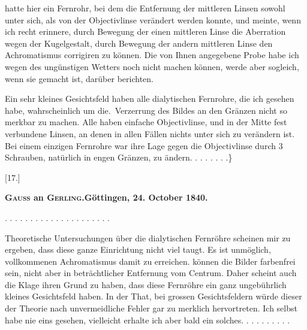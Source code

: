\par\clearpage{}
\noindent hatte hier ein Fernrohr, bei dem die Entfernung der mittleren Linsen sowohl unter sich, als von der Objectivlinse verändert werden konnte, und meinte, wenn ich recht erinnere, durch Bewegung der einen mittleren Linse die Aberration wegen der Kugelgestalt, durch Bewegung der andern mittleren Linse den Achromatismus corrigiren zu können. Die von Ihnen angegebene Probe habe ich wegen des ungünstigen Wetters noch nicht machen können, werde aber sogleich, wenn sie gemacht ist, darüber berichten.

Ein sehr kleines Gesichtsfeld haben alle dialytischen Fernrohre, die ich gesehen habe, wahrscheinlich um die.\ Verzerrung des Bildes an den Gränzen nicht so merkbar zu machen. Alle haben  einfache Objectivlinse, und in der Mitte  fest verbundene Linsen, an denen in allen Fällen nichts unter sich zu verändern ist. Bei einem einzigen Fernrohre war ihre Lage gegen die Objectivlinse durch 3 Schrauben, natürlich in engen Gränzen, zu ändern. . . . . . . .\}
\begin{center}
[17.]\par\medskip
\textbf{\textsc{Gauss} an \textsc{Gerling}.\quad Göttingen, 24. October 1840.}
\end{center}
\noindent . . . . . . . . . . . . . . . . . . . . .\par
\noindent\hspace*{\parindent}Theoretische Untersuchungen über die dialytischen Fernröhre scheinen mir zu ergeben, dass diese ganze Einrichtung nicht viel taugt. Es ist unmöglich, vollkommenen Achromatismus damit zu erreichen.  können die Bilder farbenfrei sein, nicht aber in beträchtlicher Entfernung vom Centrum. Daher scheint auch die Klage ihren Grund zu haben, dass diese Fernröhre ein ganz ungebührlich kleines Gesichtsfeld haben. In der That, bei grossen Gesichtsfeldern würde dieser der Theorie nach unvermeidliche Fehler gar zu merklich hervortreten. Ich selbst habe nie eins gesehen, vielleicht erhalte ich aber bald ein solches. . . . . . . . . .
\clearpage\endgroup
